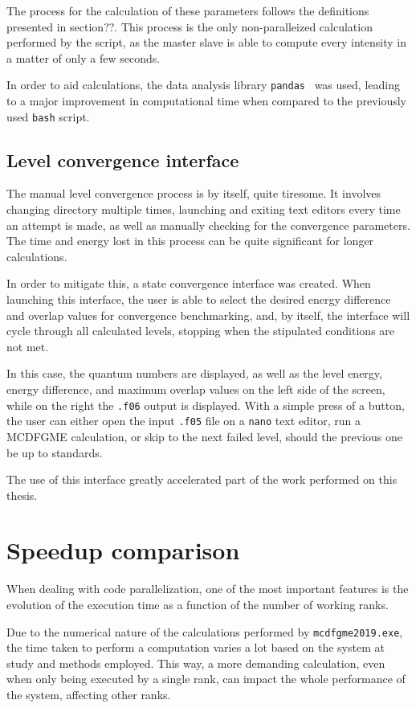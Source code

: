 The process for the calculation of these parameters follows the definitions presented in section??. This process is the only non-paralleized calculation performed by the script, as the master slave is able to compute every intensity in a matter of only a few seconds.

In order to aid calculations, the data analysis library \verb|pandas|~\cite{reback2020pandas} was used, leading to a major improvement in computational time when compared to the previously used \verb|bash| script.

\subsection{Level convergence interface}

The manual level convergence process is by itself, quite tiresome. It involves changing directory multiple times, launching and exiting text editors every time an attempt is made, as well as manually checking for the convergence parameters. The time and energy lost in this process can be quite significant for longer calculations.

In order to mitigate this, a state convergence interface was created. When launching this interface, the user is able to select the desired energy difference and overlap values for convergence benchmarking, and, by itself, the interface will cycle through all calculated levels, stopping when the stipulated conditions are not met.

In this case, the quantum numbers are displayed, as well as the level energy, energy difference, and maximum overlap values on the left side of the screen, while on the right the \verb|.f06| output is displayed. With a simple press of a button, the user can either open the input \verb|.f05| file on a \verb|nano| text editor, run a \gls{MCDFGME} calculation, or skip to the next failed level, should the previous one be up to standards.

The use of this interface greatly  accelerated part of the work performed on this thesis.
\section{Speedup comparison}

When dealing with code parallelization, one of the most important features is the evolution of the execution time as a function of the number of working ranks.

Due to the numerical nature of the calculations performed by \verb|mcdfgme2019.exe|, the time taken to perform a computation varies a lot based on the system at study and methods employed. This way, a more demanding calculation, even when only being executed by a single rank, can impact the whole performance of the system, affecting other ranks.

